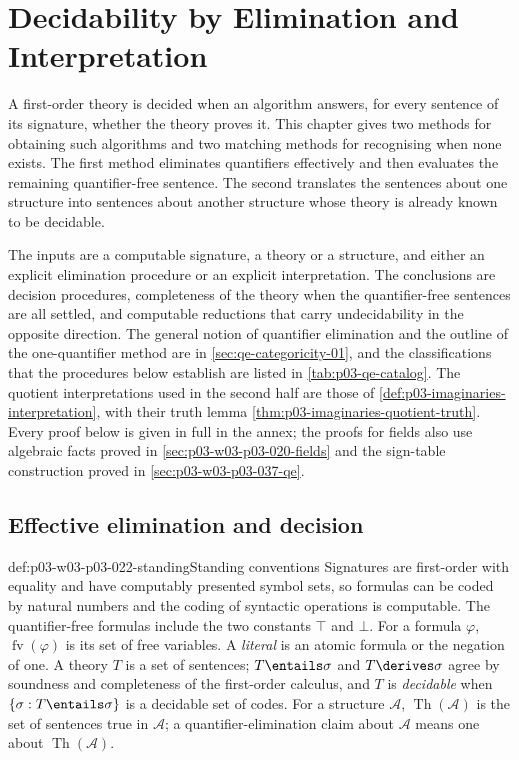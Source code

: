 \chapter{Decidability by Elimination and Interpretation}
\label{sec:p03-w03-p03-022-decidability}

A first-order theory is decided when an algorithm answers, for every
sentence of its signature, whether the theory proves it. This chapter
gives two methods for obtaining such algorithms and two matching methods
for recognising when none exists. The first method eliminates quantifiers
effectively and then evaluates the remaining quantifier-free sentence. The
second translates the sentences about one structure into sentences about
another structure whose theory is already known to be decidable.

The inputs are a computable signature, a theory or a structure, and either
an explicit elimination procedure or an explicit interpretation. The
conclusions are decision procedures, completeness of the theory when the
quantifier-free sentences are all settled, and computable reductions that
carry undecidability in the opposite direction. The general notion of
quantifier elimination and the outline of the one-quantifier method are
in \cref{sec:qe-categoricity-01}, and the classifications that the
procedures below establish are listed in \cref{tab:p03-qe-catalog}. The
quotient interpretations used in the second half are those of
\cref{def:p03-imaginaries-interpretation}, with their truth lemma
\cref{thm:p03-imaginaries-quotient-truth}. Every proof below is given in
full in the annex; the proofs for fields also use algebraic facts proved in
\cref{sec:p03-w03-p03-020-fields} and the sign-table construction proved in
\cref{sec:p03-w03-p03-037-qe}.

\section{Effective elimination and decision}
\label{sec:p03-w03-p03-022-effective}

\begin{hbconvention}{def:p03-w03-p03-022-standing}{Standing conventions}
Signatures are first-order with equality and have computably presented
symbol sets, so formulas can be coded by natural numbers and the coding of
syntactic operations is computable. The quantifier-free formulas include
the two constants \(\top\) and \(\bot\). For a formula \(\varphi\),
\(\operatorname{fv}(\varphi)\) is its set of free variables. A
\emph{literal} is an atomic formula or the negation of one. A theory
\(T\) is a set of sentences; \(T\entails\sigma\) and \(T\derives\sigma\)
agree by soundness and completeness of the first-order calculus, and
\(T\) is \emph{decidable} when \(\{\sigma: T\entails\sigma\}\) is a
decidable set of codes. For a structure \(\mathcal A\), \(\operatorname{Th}(\mathcal A)\) is
the set of sentences true in \(\mathcal A\); a quantifier-elimination claim
about \(\mathcal A\) means one about \(\operatorname{Th}(\mathcal A)\).
\end{hbconvention}

